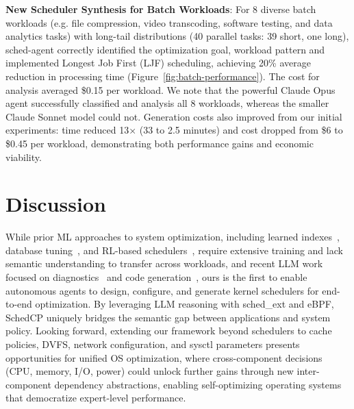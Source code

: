 \documentclass[preprint]{article}
\newcommand{\sys}{SchedCP\xspace}
\newcommand{\agent}{sched-agent\xspace}
\begin{document}
\textbf{New Scheduler Synthesis for Batch Workloads}: For 8 diverse batch workloads (e.g. file compression, video transcoding, software testing, and data analytics tasks) with long-tail distributions (40 parallel tasks: 39 short, one long), \agent correctly identified the optimization goal, workload pattern and implemented Longest Job First (LJF) scheduling, achieving 20\% average reduction in processing time (Figure~\ref{fig:batch-performance}). The cost for analysis averaged \$0.15 per workload. We note that the powerful Claude Opus agent successfully classified and analysis all 8 workloads, whereas the smaller Claude Sonnet model could not. Generation costs also improved from our initial experiments: time reduced 13× (33 to 2.5 minutes) and cost dropped from \$6 to \$0.45 per workload, demonstrating both performance gains and economic viability.


\section{Discussion}
\label{sec:discussion}

While prior ML approaches to system optimization, including learned indexes~\cite{kraska2018learned}, database tuning~\cite{marcus2019neo,vanaken2017ottertune}, and RL-based schedulers~\cite{mao2019decima,qiu2020firm,zhang2024mrsch,mao2019park}, require extensive training and lack semantic understanding to transfer across workloads, and recent LLM work focused on diagnostics~\cite{wang2024llmsys} and code generation~\cite{wei2024mapper,10.1145/3672197.3673434}, ours is the first to enable autonomous agents to design, configure, and generate kernel schedulers for end-to-end optimization. By leveraging LLM reasoning with sched\_ext and eBPF, \sys uniquely bridges the semantic gap between applications and system policy. Looking forward, extending our framework beyond schedulers to cache policies, DVFS, network configuration, and sysctl parameters presents opportunities for unified OS optimization, where cross-component decisions (CPU, memory, I/O, power) could unlock further gains through new inter-component dependency abstractions, enabling self-optimizing operating systems that democratize expert-level performance.



\end{document}
